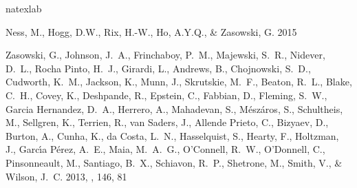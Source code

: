 \documentclass[12pt, preprint]{aastex}
\begin{document}
\begin{thebibliography}{24}
\expandafter\ifx\csname natexlab\endcsname\relax\def\natexlab#1{#1}\fi

{Ness}, M., {Hogg}, D.W., {Rix}, H.-W., {Ho}, A.Y.Q., \& {Zasowski}, G. 2015

{Zasowski}, G., {Johnson}, J.~A., {Frinchaboy}, P.~M., {Majewski}, S.~R.,
  {Nidever}, D.~L., {Rocha Pinto}, H.~J., {Girardi}, L., {Andrews}, B.,
  {Chojnowski}, S.~D., {Cudworth}, K.~M., {Jackson}, K., {Munn}, J.,
  {Skrutskie}, M.~F., {Beaton}, R.~L., {Blake}, C.~H., {Covey}, K.,
  {Deshpande}, R., {Epstein}, C., {Fabbian}, D., {Fleming}, S.~W., {Garcia
  Hernandez}, D.~A., {Herrero}, A., {Mahadevan}, S., {M{\'e}sz{\'a}ros}, S.,
  {Schultheis}, M., {Sellgren}, K., {Terrien}, R., {van Saders}, J., {Allende
  Prieto}, C., {Bizyaev}, D., {Burton}, A., {Cunha}, K., {da Costa}, L.~N.,
  {Hasselquist}, S., {Hearty}, F., {Holtzman}, J., {Garc{\'{\i}}a P{\'e}rez},
  A.~E., {Maia}, M.~A.~G., {O'Connell}, R.~W., {O'Donnell}, C., {Pinsonneault},
  M., {Santiago}, B.~X., {Schiavon}, R.~P., {Shetrone}, M., {Smith}, V., \&
  {Wilson}, J.~C. 2013, \aj, 146, 81

\end{thebibliography}
\end{document}
